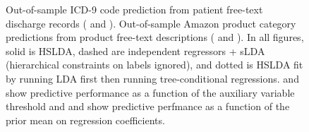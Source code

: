 \begin{figure}%
\begin{center}
\caption{Out-of-sample ICD-9 code prediction from patient free-text discharge records 
( and ). Out-of-sample Amazon product category predictions from 
product free-text descriptions ( and ). In all figures, solid is 
HSLDA, dashed are independent regressors + sLDA (hierarchical 
constraints on labels ignored), and dotted is HSLDA fit by running LDA first then running 
tree-conditional regressions. \subref{} and \subref{} show predictive performance as a function of the 
auxiliary variable threshold and  and  show predictive perfmance as a function of the
prior mean on regression coefficients.}
\label{fig:main_results}
\end{center}
\end{figure}

